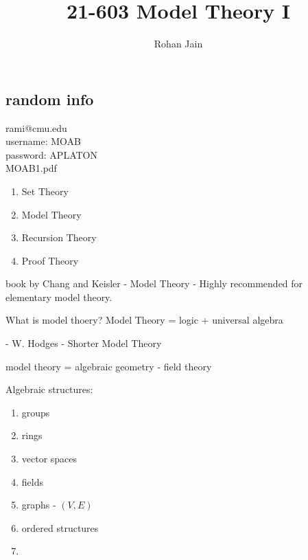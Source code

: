 \documentclass{report}
\title{\Huge{21-603 Model Theory I}}
\author{\huge{Rohan Jain}}
\date{}
\begin{document}
\maketitle
\newpage%
\tableofcontents

\pagebreak

\chapter{}
\section{random info}
rami@cmu.edu \\
username: MOAB \\
password: APLATON \\
MOAB1.pdf
\begin{enumerate}
    \item Set Theory
    \item Model Theory
    \item Recursion Theory
    \item Proof Theory
\end{enumerate}

 book by Chang and Keisler - Model Theory - Highly recommended for elementary model theory. 

\noindent What is model thoery? Model Theory = logic + universal algebra

 - W. Hodges - Shorter Model Theory

\noindent model theory = algebraic geometry - field theory

\noindent Algebraic structures:
\begin{enumerate}
    \item groups
    \item rings
    \item vector spaces 
    \item fields
    \item graphs - $(V, E)$
    \item ordered structures
    \item 
\end{enumerate}
\end{document}
